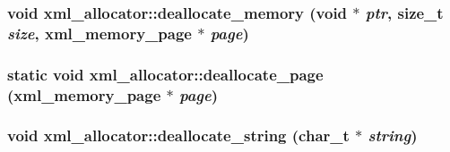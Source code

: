 \label{structxml__allocator_ac5ec2b5d41672d6494a2742e95e525b3}
\hypertarget{structxml__allocator_a5df417155487cce4e0460b123ac33dc6}{
\subsubsection[{deallocate\_\-memory}]{\setlength{\rightskip}{0pt plus 5cm}void xml\_\-allocator::deallocate\_\-memory (void $\ast$ {\em ptr}, \/  size\_\-t {\em size}, \/  {\bf xml\_\-memory\_\-page} $\ast$ {\em page})}}
\label{structxml__allocator_a5df417155487cce4e0460b123ac33dc6}
\hypertarget{structxml__allocator_a1c6bfe15a257a094f55659f8d71c209e}{
\subsubsection[{deallocate\_\-page}]{\setlength{\rightskip}{0pt plus 5cm}static void xml\_\-allocator::deallocate\_\-page ({\bf xml\_\-memory\_\-page} $\ast$ {\em page})}}
\label{structxml__allocator_a1c6bfe15a257a094f55659f8d71c209e}
\hypertarget{structxml__allocator_af32c538db4d562c2d0bfe15f7c0aa879}{
\subsubsection[{deallocate\_\-string}]{\setlength{\rightskip}{0pt plus 5cm}void xml\_\-allocator::deallocate\_\-string (char\_\-t $\ast$ {\em string})}}
\label{structxml__allocator_af32c538db4d562c2d0bfe15f7c0aa879}


